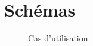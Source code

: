 \documentclass[a4paper,10pt,twoside]{sphinxmanual}
\begin{document}
\chapter{Schémas}
\label{schemas::doc}\label{schemas:schemas}\begin{figure}[htbp]
\centering
\capstart

\caption{Cas d'utilisation}\end{figure}
\end{document}
